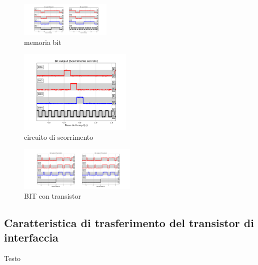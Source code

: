 \documentclass[journal]{IEEEtran}
\begin{document}
\begin{figure}[H]%
\begin{center}
\includegraphics[trim = {600 0 100 0}, clip, width=0.39\textwidth]{analysis/output/cumulative_BIT.pdf}
\caption{memoria bit}
\label{fig:cumulative_BIT}
\end{center}
\end{figure}


\begin{figure}[H]%
\begin{center}
\includegraphics[width=0.48\textwidth]{analysis/output/BIT-shift-clk.pdf}
\caption{circuito di scorrimento}
\label{fig:BIT_shift_clk}
\end{center}
\end{figure}

\begin{figure}[H]%
\begin{center}
\includegraphics[trim = {570 0 0 0}, clip, width=0.50\textwidth]{analysis/output/cumulative_BIT_with_transistor.pdf}
\caption{BIT con transistor}
\label{fig:BIT_with_transistor}
\end{center}
\end{figure}




\subsection{Caratteristica di trasferimento del transistor di interfaccia}
Testo
\end{document}
